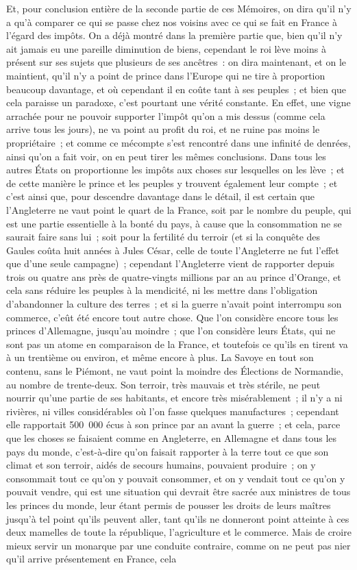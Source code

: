 \documentclass[french,twoside]{book} %
\begin{document}
Et, pour conclusion entière de la seconde partie de ces Mémoires, on dira qu’il n’y a qu’à comparer ce qui se passe chez nos voisins avec ce qui se fait en France à l’égard des impôts. On a déjà montré dans la première partie que, bien qu’il n’y ait jamais eu une pareille diminution de biens, cependant le roi lève moins à présent sur ses sujets que plusieurs de ses ancêtres : on dira maintenant, et on le maintient, qu’il n’y a point de prince dans l’Europe qui ne tire à proportion beaucoup davantage, et où cependant il en coûte tant à ses peuples ; et bien que cela paraisse un paradoxe, c’est pourtant une vérité constante. En effet, une vigne arrachée pour ne pouvoir supporter l’impôt qu’on a mis dessus (comme cela arrive tous les jours), ne va point au profit du roi, et ne ruine pas moins le propriétaire ; et comme ce mécompte s’est rencontré dans une infinité de denrées, ainsi qu’on a fait voir, on en peut tirer les mêmes conclusions. Dans tous les autres États on proportionne les impôts aux choses sur lesquelles on les lève ; et de cette manière le prince et les peuples y trouvent également leur compte ; et c’est ainsi que, pour descendre davantage dans le détail, il est certain que l’Angleterre ne vaut point le quart de la France, soit par le nombre du peuple, qui est une partie essentielle à la bonté du pays, à cause que la consommation ne se saurait faire sans lui ; soit pour la fertilité du terroir (et si la conquête des Gaules coûta huit années à Jules César, celle de toute l’Angleterre ne fut l’effet que d’une seule campagne) ; cependant l’Angleterre vient de rapporter depuis trois ou quatre ans près de quatre-vingts millions par an au prince d’Orange, et cela sans réduire les peuples à la mendicité, ni les mettre dans l’obligation d’abandonner la culture des terres ; et si la guerre n’avait point interrompu son commerce, c’eût été encore tout autre chose. Que l’on considère encore tous les princes d’Allemagne, jusqu’au moindre ; que l’on considère leurs États, qui ne sont pas un atome en comparaison de la France, et toutefois ce qu’ils en tirent va à un trentième ou environ, et même encore à plus. La Savoye en tout son contenu, sans le Piémont, ne vaut point la moindre des Élections de Normandie, au nombre de trente-deux. Son terroir, très mauvais et très stérile, ne peut nourrir qu’une partie de ses habitants, et encore très misérablement ; il n’y a ni rivières, ni villes considérables où l’on fasse quelques manufactures ; cependant elle rapportait 500 000 écus à son prince par an avant la guerre ; et cela, parce que les choses se faisaient comme en Angleterre, en Allemagne et dans tous les pays du monde, c’est-à-dire qu’on faisait rapporter à la terre tout ce que son climat et son terroir, aidés de secours humains, pouvaient produire ; on y consommait tout ce qu’on y pouvait consommer, et on y vendait tout ce qu’on y pouvait vendre, qui est une situation qui devrait être sacrée aux ministres de tous les princes du monde, leur étant permis de pousser les droits de leurs maîtres jusqu’à tel point qu’ils peuvent aller, tant qu’ils ne donneront point atteinte à ces deux mamelles de toute la république, l’agriculture et le commerce. Mais de croire mieux servir un monarque par une conduite contraire, comme on ne peut pas nier qu’il arrive présentement en France, cela 
\end{document}
